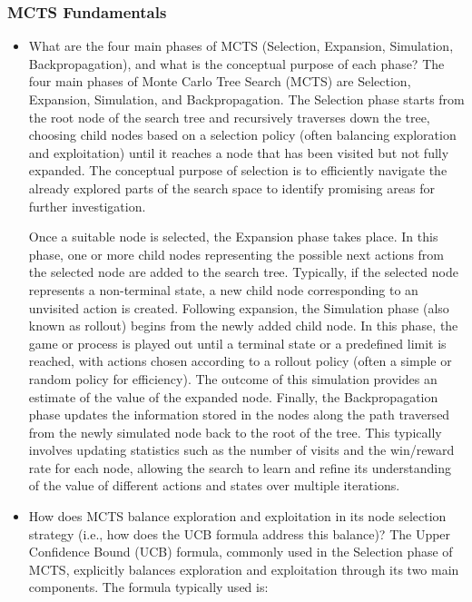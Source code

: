 \subsubsection{MCTS Fundamentals}
\begin{itemize}
    \item What are the four main phases of MCTS (Selection, Expansion, Simulation, Backpropagation), and what is the conceptual purpose of each phase?
    The four main phases of Monte Carlo Tree Search (MCTS) are Selection, Expansion, Simulation, and Backpropagation. The Selection phase starts from the root node of the search tree and recursively traverses down the tree, choosing child nodes based on a selection policy (often balancing exploration and exploitation) until it reaches a node that has been visited but not fully expanded. The conceptual purpose of selection is to efficiently navigate the already explored parts of the search space to identify promising areas for further investigation.

Once a suitable node is selected, the Expansion phase takes place. In this phase, one or more child nodes representing the possible next actions from the selected node are added to the search tree. Typically, if the selected node represents a non-terminal state, a new child node corresponding to an unvisited action is created. Following expansion, the Simulation phase (also known as rollout) begins from the newly added child node. In this phase, the game or process is played out until a terminal state or a predefined limit is reached, with actions chosen according to a rollout policy (often a simple or random policy for efficiency). The outcome of this simulation provides an estimate of the value of the expanded node. Finally, the Backpropagation phase updates the information stored in the nodes along the path traversed from the newly simulated node back to the root of the tree. This typically involves updating statistics such as the number of visits and the win/reward rate for each node, allowing the search to learn and refine its understanding of the value of different actions and states over multiple iterations.
    \item How does MCTS balance exploration and exploitation in its node selection strategy (i.e., how does the UCB formula address this balance)?
    The Upper Confidence Bound (UCB) formula, commonly used in the Selection phase of MCTS, explicitly balances exploration and exploitation through its two main components. The formula typically used is:


\end{itemize}
